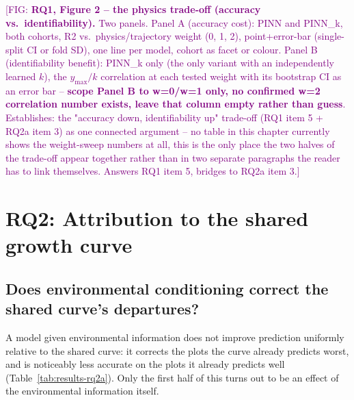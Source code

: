 \documentclass[11pt,a4paper]{report}
\newcommand{\fig}[1]{\textcolor{purple}{[FIG: #1]}}
\begin{document}
\fig{\textbf{RQ1, Figure 2 -- the physics trade-off (accuracy vs.\ identifiability).}
Two panels. Panel A (accuracy cost): PINN and PINN\_k, both cohorts, R2 vs.\
physics/trajectory weight (0, 1, 2), point+error-bar (single-split CI or fold SD), one
line per model, cohort as facet or colour. Panel B (identifiability benefit): PINN\_k
only (the only variant with an independently learned $k$), the $y_{\max}/k$
correlation at each tested weight with its bootstrap CI as an error bar --
\textbf{scope Panel B to w=0/w=1 only, no confirmed w=2 correlation number exists, leave
that column empty rather than guess}. Establishes: the "accuracy down, identifiability
up" trade-off (RQ1 item 5 + RQ2a item 3) as one connected argument -- no table in this
chapter currently shows the weight-sweep numbers at all, this is the only place the two
halves of the trade-off appear together rather than in two separate paragraphs the
reader has to link themselves. Answers RQ1 item 5, bridges to RQ2a item 3.}


\section{RQ2: Attribution to the shared growth curve}
\label{sec:results-rq2}

\subsection{Does environmental conditioning correct the shared curve's departures?}
\label{sec:results-rq2a}

A model given environmental information does not improve prediction uniformly
relative to the shared curve: it corrects the plots the curve already predicts worst,
and is noticeably less accurate on the plots it already predicts well
(Table~\ref{tab:results-rq2a}). Only the first half of this turns out to be an effect
of the environmental information itself.
\end{document}
